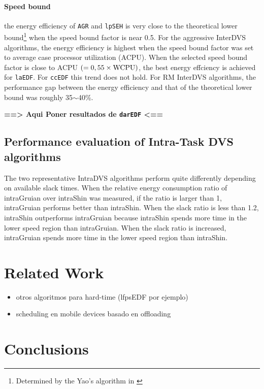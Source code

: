 \documentclass[10pt,article]{IEEEtran}
\begin{document}
\paragraph{Speed bound} the energy efficiency of \texttt{AGR} and \texttt{lpSEH} is very close to the theoretical lower bound\footnote{Determined by the Yao's algorithm in \cite{yao}} when the speed bound factor is near 0.5. For the aggressive InterDVS algorithms, the energy efficiency is highest when the speed bound factor was set to average case processor utilization (ACPU). When the selected speed bound factor is close to ACPU $(= 0,55 \times \textnormal{WCPU})$, the best energy effciency is achieved for \texttt{laEDF}. For \texttt{ccEDF} this trend does not hold. For RM InterDVS algorithms, the performance gap between the energy efficiency and that of the theoretical lower bound was roughly 35$\sim$40\%.

\textbf{==> Aqui Poner resultados de \texttt{darEDF} <==}

\subsection{Performance evaluation of Intra-Task DVS algorithms}
The two representative IntraDVS algorithms perform quite differently depending on available slack times. When the relative energy consumption ratio of intraGruian over intraShin was measured, if the ratio is larger than 1, intraGruian performs better than intraShin. When  the  slack  ratio  is  less  than  1.2, intraShin outperforms intraGruian because intraShin spends more time in the lower speed region than intraGruian. When the slack ratio is increased, intraGruian spends more time in the lower speed region than intraShin.







\section{Related Work}
\begin{itemize}
    \item otros algoritmos para hard-time (lfpsEDF por ejemplo)
    \item scheduling en mobile devices basado en offloading
\end{itemize}


\section{Conclusions}
\end{document}
